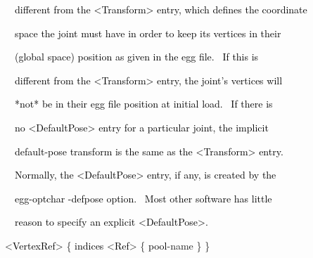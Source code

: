\documentclass[a4paper]{article}
\newcommand\textstyleOOoComputerKeyWord[1]{\textrm{\textcolor[rgb]{0.0,0.0,0.5019608}{#1}}}
\newcommand\textstyleOOoAssemblerSpecialChar[1]{\textrm{\textcolor[rgb]{0.0,0.5019608,0.0}{#1}}}
\newcommand\textstyleOOoAssemblerIdent[1]{\textrm{\textcolor{black}{#1}}}
\newcommand\textstyleOOoAssemblerDirective[1]{\textrm{\textcolor[rgb]{0.0,0.5019608,1.0}{#1}}}
\begin{document}
\clearpage
\bigskip

{\color{black}
\textstyleOOoComputerKeyWord{\textcolor{black}{\ \ \ \ different from the {\textless}Transform{\textgreater} entry,
which defines the coordinate}}}

{\color{black}
\textstyleOOoComputerKeyWord{\textcolor{black}{\ \ \ \ space the joint must have in order to keep its vertices in
their}}}

{\color{black}
\textstyleOOoComputerKeyWord{\textcolor{black}{\ \ \ \ (global space) position as given in the egg file. \ If this is}}}

{\color{black}
\textstyleOOoComputerKeyWord{\textcolor{black}{\ \ \ \ different from the {\textless}Transform{\textgreater} entry, the
joint's vertices will}}}

{\color{black}
\textstyleOOoComputerKeyWord{\textcolor{black}{\ \ \ \ *not* be in their egg file position at initial load. \ If there
is}}}

{\color{black}
\textstyleOOoComputerKeyWord{\textcolor{black}{\ \ \ \ no {\textless}DefaultPose{\textgreater} entry for a particular
joint, the implicit}}}

{\color{black}
\textstyleOOoComputerKeyWord{\textcolor{black}{\ \ \ \ default-pose transform is the same as the
{\textless}Transform{\textgreater} entry.}}}


\bigskip

{\color{black}
\textstyleOOoComputerKeyWord{\textcolor{black}{\ \ \ \ Normally, the {\textless}DefaultPose{\textgreater} entry, if any,
is created by the}}}

{\color{black}
\textstyleOOoComputerKeyWord{\textcolor{black}{\ \ \ \ egg-optchar -defpose option. \ Most other software has little}}}

{\color{black}
\textstyleOOoComputerKeyWord{\textcolor{black}{\ \ \ \ reason to specify an explicit
{\textless}DefaultPose{\textgreater}.}}}


\bigskip

{\color{black}
\textstyleOOoComputerKeyWord{\textcolor{black}{\ \ }}\textstyleOOoAssemblerSpecialChar{{\textless}}\textstyleOOoAssemblerIdent{VertexRef}\textstyleOOoAssemblerSpecialChar{{\textgreater}}\textstyleOOoComputerKeyWord{\textcolor{black}{
}}\textstyleOOoAssemblerSpecialChar{\{}\textstyleOOoComputerKeyWord{\textcolor{black}{
}}\textstyleOOoAssemblerIdent{indices}\textstyleOOoComputerKeyWord{\textcolor{black}{
}}\textstyleOOoAssemblerSpecialChar{{\textless}}\textstyleOOoAssemblerIdent{Ref}\textstyleOOoAssemblerSpecialChar{{\textgreater}}\textstyleOOoComputerKeyWord{\textcolor{black}{
}}\textstyleOOoAssemblerSpecialChar{\{}\textstyleOOoComputerKeyWord{\textcolor{black}{
}}\textstyleOOoAssemblerIdent{pool}\textstyleOOoAssemblerSpecialChar{{}-}\textstyleOOoAssemblerDirective{name}\textstyleOOoComputerKeyWord{\textcolor{black}{
}}\textstyleOOoAssemblerSpecialChar{\}}\textstyleOOoComputerKeyWord{\textcolor{black}{
}}\textstyleOOoAssemblerSpecialChar{\}}}
\end{document}
